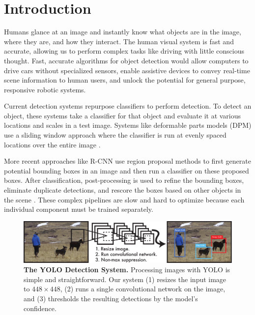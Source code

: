 \documentclass[10pt,twocolumn,letterpaper]{article}
\begin{document}
\section{Introduction}

Humans glance at an image and instantly know what objects are in the image, where they are, and how they interact. The human visual system is fast and accurate, allowing us to perform complex tasks like driving with little conscious thought. Fast, accurate algorithms for object detection would allow computers to drive cars without specialized sensors, enable assistive devices to convey real-time scene information to human users, and unlock the potential for general purpose, responsive robotic systems.
%

Current detection systems repurpose classifiers to perform detection. To detect an object, these systems take a classifier for that object and evaluate it at various locations and scales in a test image. Systems like deformable parts models (DPM) use a sliding window approach where the classifier is run at evenly spaced locations over the entire image \cite{lsvm-pami}.

More recent approaches like R-CNN use region proposal methods to first generate potential bounding boxes in an image and then run a classifier on these proposed boxes. After classification, post-processing is used to refine the bounding boxes, eliminate duplicate detections, and rescore the boxes based on other objects in the scene \cite{girshick2014rich}. These complex pipelines are slow and hard to optimize because each individual component must be trained separately.

\begin{figure}[t]
\begin{center}
        \includegraphics[width=\linewidth]{system}
\end{center}
   \caption{\small \textbf{The YOLO Detection System.} Processing images with YOLO is simple and straightforward. Our system (1) resizes the input image to $448 \times 448$, (2) runs a single convolutional network on the image, and (3) thresholds the resulting detections by the model's confidence.}
\label{system}
\end{figure}
\end{document}
